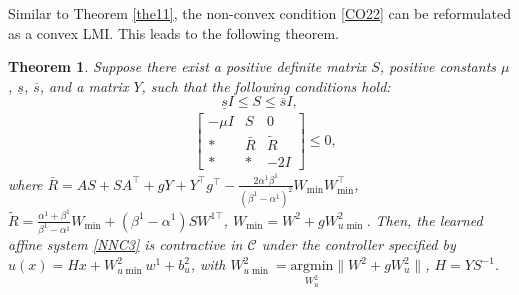 \documentclass[journal,twoside,web]{ieeecolor}
\newtheorem{theorem}            {Theorem}[section]
\begin{document}
Similar to Theorem \ref{the11}, the non-convex condition \eqref{CO22} can be reformulated as a convex LMI. This leads to the following theorem.
\begin{theorem}\label{the21}
Suppose there exist a positive definite matrix $S$, positive constants $\mu$, $\underline{s}$, $\overline{s}$, and a matrix $Y$, such that the following conditions hold:
\begin{equation}\label{CO31}
 \underline{s}I\leq S\leq \overline{s}I, 
\end{equation}
\begin{equation}\label{CO32}
\begin{aligned}
&\begin{bmatrix}
-\mu I&S &0\\\ast&\bar{R}&\tilde{R}\\
\ast&\ast& -2I
\end{bmatrix}\leq 0,
\end{aligned}
\end{equation}
where $\bar{R}=AS+SA^\top+gY+Y^\top g^\top-\frac{2\alpha^1\beta^1}{(\beta^1-\alpha^1)^2}W_{\min}W_{\min}^{\top}$, $\tilde{R}=\frac{\alpha^1+\beta^1}{\beta^1-\alpha^1}W_{\min}+(\beta^1-\alpha^1)SW^{1\top}$, $W_{\min}=W^2+gW_{u\min}^{2}$. Then, the learned affine system \eqref{NNC3} is contractive in $\mathcal{C}$ under the controller specified by $u(x)=Hx+W_{u\min}^{2}w^1+b_u^{2}$, with $W_{u\min}^{2}=\underset{W_u^{2}}{\text{argmin}} \|W^{2}+gW_u^{2}\|$, $H=YS^{-1}$.
\end{theorem}
\end{document}

